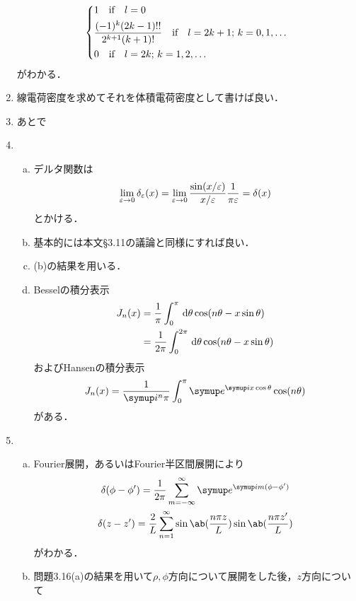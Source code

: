 \begin{enumerate}[label={\large 3.\arabic*}]
\begin{gather}
      \begin{dcases}%
        1 \qqtext{if} l = 0\\
        \frac{(-1)^k(2k-1)!!}{2^{k+1} (k+1)!} \qqtext{if} l = 2k+1;\, k=0,1,\ldots\\
        0 \qqtext{if}l = 2k;\, k = 1, 2, \ldots
      \end{dcases}
    \end{gather}
    がわかる．
  \item 線電荷密度を求めてそれを体積電荷密度として書けば良い．
  \item あとで
  \item 
    \begin{enumerate}[(a)]%
      \item  デルタ関数は
        \begin{gather}%
          \lim_{\eps\to 0} \delta_\eps(x) = \lim_{\eps \to 0} \frac{\sin(x/\eps)}{x/\eps} \frac{1}{\pi \eps} = \delta(x)
        \end{gather}%
        とかける．
      \item 基本的には本文\S 3.11の議論と同様にすれば良い．
      \item (b)の結果を用いる．
      \item Besselの積分表示
        \begin{align}%
          J_n(x) &= \frac{1}{\pi} \int_0^\pi \dl{\theta} \cos(n\theta -x\sin\theta)\\
          &= \frac{1}{2\pi}\int_0^{2\pi}\dl{\theta}\cos(n \theta - x \sin\theta)
        \end{align}%
        およびHansenの積分表示
        \begin{gather}%
          J_n(x) = \frac{1}{\i^n\pi}  \int_0^\pi \e^{\i x\cos\theta}\cos(n \theta)
        \end{gather}%
        がある．
    \end{enumerate}%
  \item 
    \begin{enumerate}[(a)]%
      \item  
        Fourier展開，あるいはFourier半区間展開により
        \begin{gather}%
          \delta(\phi - \phi ') =
          \frac{1}{2\pi} \sum_{m=-\infty}^\infty \e^{\i m(\phi - \phi')}\\
          \delta(z- z') = 
          \frac{2}{L} \sum_{n=1}^\infty\sin\ab(\frac{n\pi z}{L})\sin\ab(\frac{n\pi z'}{L})
        \end{gather}%
        がわかる．
      \item 問題3.16(a)の結果を用いて$\rho, \phi$方向について展開をした後，$z$方向について

\end{enumerate}
\end{enumerate}
